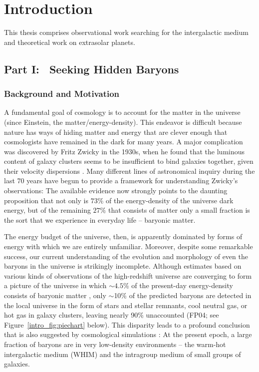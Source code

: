 \chapter{Introduction}
\label{ch:introduction}
\markright{}


This thesis comprises observational work searching for the
intergalactic medium and theoretical work on extrasolar planets.

\section[Part I: ~Seeking Hidden Baryons]{Part I: ~Seeking Hidden Baryons}
\label{intro_sec:groups}
\subsection[Background and Motivation]{Background and Motivation}
\label{intro_ssec:baryons background}
A fundamental goal of cosmology is to account for the matter in the
universe (since Einstein, the matter/energy-density).  This endeavor
is difficult because nature has ways of hiding matter and energy that
are clever enough that cosmologists have remained in the dark for many
years.  A major complication was discovered by Fritz Zwicky in the
1930s, when he found that the luminous content of galaxy clusters
seems to be insufficient to bind galaxies together, given their
velocity dispersions \citep{zwicky1937,zwicky1938}.  Many different
lines of astronomical inquiry during the last 70 years have begun to
provide a framework for understanding Zwicky's observations: The
available evidence now strongly points to the daunting proposition
that not only is $73\%$ of the energy-density of the universe dark
energy, but of the remaining $27\%$ that consists of
matter
only a small fraction is the sort that we experience in everyday life
-- baryonic matter.

The energy budget of the universe, then, is apparently dominated by
forms of energy with which we are entirely unfamiliar.  Moreover,
despite some remarkable success, our current understanding of the
evolution and morphology of even the baryons in the universe is
strikingly incomplete.  Although estimates based on various kinds of
observations of the high-redshift universe are converging to form a
picture of the universe in which $\sim 4.5\%$ of the present-day
energy-density consists of baryonic matter \citep[hereafter
  FP04]{fukugita+peebles2004}, only $\sim$10\% of the predicted
baryons are detected in the local universe in the form of stars and
stellar remnants, cool neutral gas, or hot gas in galaxy clusters,
leaving nearly 90\% unaccounted (FP04; see
Figure~\ref{intro_fig:piechart} below).  This disparity leads to a
profound conclusion that is also suggested by cosmological simulations
\citep{dave_et_al2001}: At the present epoch, a large fraction of
baryons are in very low-density environments -- the warm-hot
intergalactic medium (WHIM) and the intragroup medium of small groups
of galaxies.

